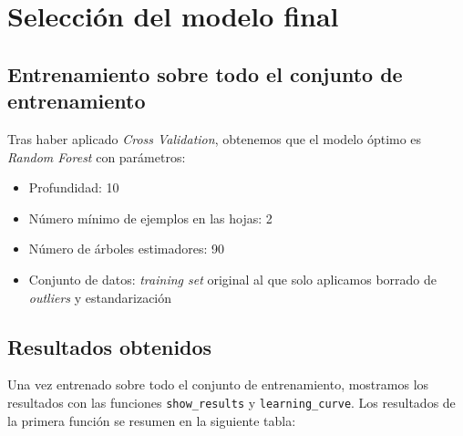 \documentclass[11pt]{article}
\begin{document}
\begin{table}[H]
  \centering
  \caption{Mejores resultados}
\end{table}

\pagebreak

\section{Selección del modelo final}

\subsection{Entrenamiento sobre todo el conjunto de entrenamiento}

Tras haber aplicado \emph{Cross Validation}, obtenemos que el modelo óptimo es \emph{Random Forest} con parámetros:

\begin{itemize}
  \item Profundidad: 10
  \item Número mínimo de ejemplos en las hojas: 2
  \item Número de árboles estimadores: 90
  \item Conjunto de datos: \emph{training set} original al que solo aplicamos borrado de \emph{outliers} y  estandarización
\end{itemize}

\subsection{Resultados obtenidos}

Una vez entrenado sobre todo el conjunto de entrenamiento, mostramos los resultados con las funciones \lstinline{show_results} y \lstinline{learning_curve}. Los resultados de la primera función se resumen en la siguiente tabla:
\end{document}
